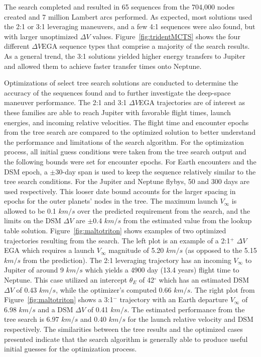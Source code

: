 \documentclass[letterpaper, paper,11pt]{AAS}	%
\begin{document}
The search completed and resulted in 65 sequences from the 704,000 nodes created and 7 million Lambert arcs performed. As expected, most solutions used the 2:1 or 3:1 leveraging maneuvers, and a few 4:1 sequences were also found, but with larger unoptimized $\Delta V$ values. Figure~\ref{fig:tridentMCTS} shows the four different $\Delta V$EGA sequence types that comprise a majority of the search results. As a general trend, the 3:1 solutions yielded higher energy transfers to Jupiter and allowed them to achieve faster transfer times onto Neptune.

Optimizations of select tree search solutions are conducted to determine the accuracy of the sequences found and to further investigate the deep-space maneuver performance. The 2:1 and 3:1 $\Delta V$EGA trajectories are of interest as these families are able to reach Jupiter with favorable flight times, launch energies, and incoming relative velocities. The flight time and encounter epochs from the tree search are compared to the optimized solution to better understand the performance and limitations of the search algorithm. For the optimization process, all initial guess conditions were taken from the tree search output and the following bounds were set for encounter epochs. For Earth encounters and the DSM epoch, a $\pm$30-day span is used to keep the sequence relatively similar to the tree search conditions. For the Jupiter and Neptune flybys, 50 and 300 days are used respectively. This looser date bound accounts for the larger spacing in epochs for the outer planets' nodes in the tree. The maximum launch $V_\infty$ is allowed to be 0.1 $km/s$ over the predicted requirement from the search, and the limits on the DSM $\Delta V$ are $\pm$0.4 $km/s$ from the estimated value from the lookup table solution. Figure~\ref{fig:maltotriton} shows examples of two optimized trajectories resulting from the search. The left plot is an example of a 2:1$^{+}$ $\Delta V$EGA which requires a launch $V_\infty$ magnitude of 5.20 $km/s$ (as opposed to the \hspace{0.5px} 5.15 $km/s$ from the prediction). The 2:1 leveraging trajectory has an incoming $V_\infty$ to Jupiter of around 9 $km/s$ which yields a 4900 day (13.4 years) flight time to Neptune. This case utilized an intercept $\theta_E$ of 42$^\circ$ which has an estimated DSM $\Delta V$ of 0.43 $km/s$, while the optimizer's computed 0.66 $km/s$. The right plot from Figure~\ref{fig:maltotriton} shows a 3:1$^{-}$ trajectory with an Earth departure $V_\infty$ of 6.98 $km/s$ and a DSM $\Delta V$ of 0.41 $km/s$. The estimated performance from the tree search is 6.97 $km/s$ and 0.40 $km/s$ for the launch relative velocity and DSM respectively. The similarities between the tree results and the optimized cases presented indicate that the search algorithm is generally able to produce useful initial guesses for the optimization process.
\end{document}
